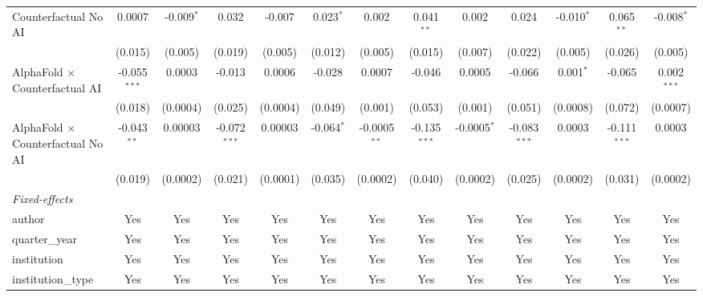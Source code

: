\begin{tabular}{lcccccccccccc}
   Counterfactual No AI                     & 0.0007         & -0.009$^{*}$ & 0.032          & -0.007       & 0.023$^{*}$   & 0.002          & 0.041$^{**}$   & 0.002         & 0.024          & -0.010$^{*}$   & 0.065$^{**}$   & -0.008$^{*}$\\   
                                            & (0.015)        & (0.005)      & (0.019)        & (0.005)      & (0.012)       & (0.005)        & (0.015)        & (0.007)       & (0.022)        & (0.005)        & (0.026)        & (0.005)\\   
   AlphaFold $\times$ Counterfactual AI     & -0.055$^{***}$ & 0.0003       & -0.013         & 0.0006       & -0.028        & 0.0007         & -0.046         & 0.0005        & -0.066         & 0.001$^{*}$    & -0.065         & 0.002$^{***}$\\   
                                            & (0.018)        & (0.0004)     & (0.025)        & (0.0004)     & (0.049)       & (0.001)        & (0.053)        & (0.001)       & (0.051)        & (0.0008)       & (0.072)        & (0.0007)\\   
   AlphaFold $\times$ Counterfactual No AI  & -0.043$^{**}$  & 0.00003      & -0.072$^{***}$ & 0.00003      & -0.064$^{*}$  & -0.0005$^{**}$ & -0.135$^{***}$ & -0.0005$^{*}$ & -0.083$^{***}$ & 0.0003         & -0.111$^{***}$ & 0.0003\\   
                                            & (0.019)        & (0.0002)     & (0.021)        & (0.0001)     & (0.035)       & (0.0002)       & (0.040)        & (0.0002)      & (0.025)        & (0.0002)       & (0.031)        & (0.0002)\\   
   \midrule
   \emph{Fixed-effects}\\
   author                                   & Yes            & Yes          & Yes            & Yes          & Yes           & Yes            & Yes            & Yes           & Yes            & Yes            & Yes            & Yes\\  
   quarter\_year                            & Yes            & Yes          & Yes            & Yes          & Yes           & Yes            & Yes            & Yes           & Yes            & Yes            & Yes            & Yes\\  
   institution                              & Yes            & Yes          & Yes            & Yes          & Yes           & Yes            & Yes            & Yes           & Yes            & Yes            & Yes            & Yes\\  
   institution\_type                        & Yes            & Yes          & Yes            & Yes          & Yes           & Yes            & Yes            & Yes           & Yes            & Yes            & Yes            & Yes\\  

\end{tabular}
